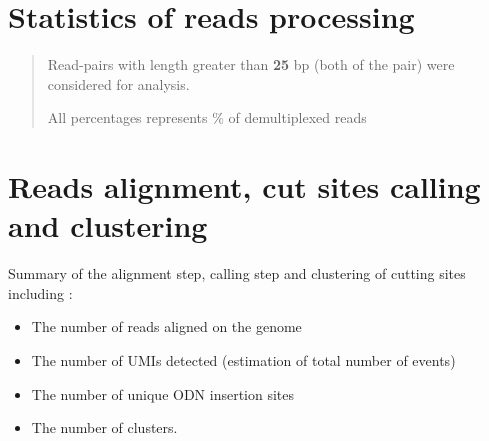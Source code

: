 \documentclass[
]{article}
\begin{document}
\section{Statistics of reads
processing}\label{statistics-of-reads-processing}

\begin{table}[H]
\centering\centering
\caption{\label{tab:unnamed-chunk-3}Table 2}
\centering
{}
\end{table}

\begin{quote}
Read-pairs with length greater than \textbf{25} bp (both of the pair)
were considered for analysis.

All percentages represents \% of demultiplexed reads
\end{quote}

\section{Reads alignment, cut sites calling and
clustering}\label{reads-alignment-cut-sites-calling-and-clustering}

Summary of the alignment step, calling step and clustering of cutting
sites including :

\begin{itemize}
\item
  The number of reads aligned on the genome
\item
  The number of UMIs detected (estimation of total number of events)
\item
  The number of unique ODN insertion sites
\item
  The number of clusters.
\end{itemize}
\end{document}
